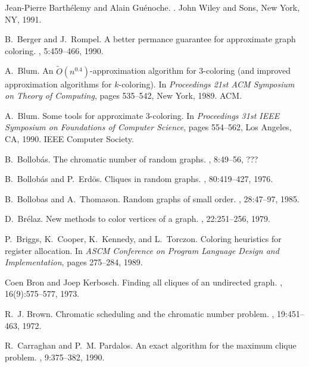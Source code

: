 \begin{thebibliography}{10}
Jean-Pierre Barth\'elemy and Alain Gu\'enoche.
.
\newblock John Wiley and Sons, New York, NY, 1991.

B.~Berger and J.~Rompel.
\newblock A better permance guarantee for approximate graph coloring.
, 5:459--466, 1990.

A.~Blum.
\newblock An $\tilde{O} ( n^{0.4} )$-approximation algorithm for 3-coloring
  (and improved approximation algorithms for $k$-coloring).
\newblock In {\em Proceedings 21st {ACM} {S}ymposium on {T}heory of
  {C}omputing}, pages 535--542, New York, 1989. ACM.

A.~Blum.
\newblock Some tools for approximate 3-coloring.
\newblock In {\em Proceedings 31st {IEEE} {S}ymposium on {F}oundations of
  {C}omputer {S}cience}, pages 554--562, Los Angeles, CA, 1990. IEEE Computer
  Society.

B.~Bollob\'as.
\newblock The chromatic number of random graphs.
, 8:49--56, ???

B.~Bollob\'as and P.~Erd\"os.
\newblock Cliques in random graphs.
,
  80:419--427, 1976.

B.~Bollobas and A.~Thomason.
\newblock Random graphs of small order.
, 28:47--97, 1985.

D.~Br{\'e}laz.
\newblock New methods to color vertices of a graph.
, 22:251--256, 1979.

P.~Briggs, K.~Cooper, K.~Kennedy, and L.~Torczon.
\newblock Coloring heuristics for register allocation.
\newblock In {\em ASCM Conference on Program Language Design and
  Implementation}, pages 275--284, 1989.

Coen Bron and Joep Kerbosch.
\newblock Finding all cliques of an undirected graph.
, 16(9):575--577, 1973.

R.~J. Brown.
\newblock Chromatic scheduling and the chromatic number problem.
, 19:451--463, 1972.

R.~Carraghan and P.~M. Pardalos.
\newblock An exact algorithm for the maximum clique problem.
, 9:375--382, 1990.


\end{thebibliography}
